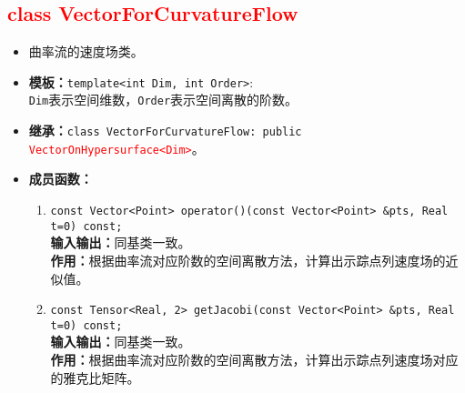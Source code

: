 \documentclass[a4paper,twoside]{ctexart}
\begin{document}
\textcolor{red}{
\section{class VectorForCurvatureFlow}}
\begin{itemize}
    \item 曲率流的速度场类。
    \item \textbf{模板：}\texttt{template<int Dim, int Order>}:\\
    \texttt{Dim}表示空间维数，\texttt{Order}表示空间离散的阶数。
    \item \textbf{继承：}\texttt{class VectorForCurvatureFlow: public \textcolor{red}{VectorOnHypersurface<Dim>}}。
    \item \textbf{成员函数：}
        \begin{enumerate}[(1)]
            \item \texttt{const Vector<Point> operator()(const Vector<Point> \&pts, Real t=0) const;}\\
            \textbf{输入输出：}同基类一致。\\
            \textbf{作用：}根据曲率流对应阶数的空间离散方法，计算出示踪点列速度场的近似值。
            \item \texttt{const Tensor<Real, 2> getJacobi(const Vector<Point> \&pts, Real t=0) const;}\\
            \textbf{输入输出：}同基类一致。\\
            \textbf{作用：}根据曲率流对应阶数的空间离散方法，计算出示踪点列速度场对应的雅克比矩阵。
        \end{enumerate}
\end{itemize}
\end{document}
